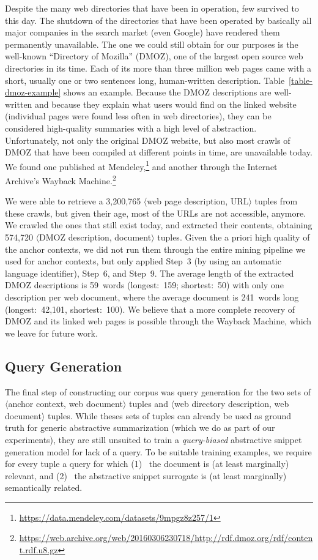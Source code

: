 \documentclass[sigconf]{acmart}
\newcommand{\Ni}{(1)~}
\newcommand{\Nii}{(2)~}
\begin{document}
Despite the many web directories that have been in operation, few survived to this day. The shutdown of the directories that have been operated by basically all major companies in the search market (even Google) have rendered them permanently unavailable. The one we could still obtain for our purposes is the well-known ``Directory of Mozilla'' (DMOZ), one of the largest open source web directories in its time. Each of its more than three million web pages came with a short, usually one or two sentences long, human-written description. Table~\ref{table-dmoz-example} shows an example. Because the DMOZ descriptions are well-written and because they explain what users would find on the linked website (individual pages were found less often in web directories), they can be considered high-quality summaries with a high level of abstraction. Unfortunately, not only the original DMOZ website, but also most crawls of DMOZ that have been compiled at different points in time, are unavailable today. We found one published at Mendeley,\footnote{\url{https://data.mendeley.com/datasets/9mpgz8z257/1}}
and another through the Internet Archive's Wayback Machine.\footnote{\fontsize{6.7pt}{7pt}\selectfont\url{https://web.archive.org/web/20160306230718/http://rdf.dmoz.org/rdf/content.rdf.u8.gz}}

We were able to retrieve a 3,200,765 $\langle$web page description, URL$\rangle$ tuples from these crawls, but given their age, most of the URLs are not accessible, anymore. We crawled the ones that still exist today, and extracted their contents, obtaining 574,720 $\langle$DMOZ description, document$\rangle$ tuples. Given the a priori high quality of the anchor contexts, we did not run them through the entire mining pipeline we used for anchor contexts, but only applied Step~3 (by using an automatic language identifier), Step~6, and Step~9. The average length of the extracted DMOZ descriptions is 59~words (longest:~159; shortest:~50) with only one description per web document, where the average document is 241~words long (longest:~42,101, shortest:~100). We believe that a more complete recovery of DMOZ and its linked web pages is possible through the Wayback Machine, which we leave for future work.

\subsection{Query Generation}

The final step of constructing our corpus was query generation for the two sets of $\langle$anchor context, web document$\rangle$ tuples and $\langle$web directory description, web document$\rangle$ tuples. While theses sets of tuples can already be used as ground truth for generic abstractive summarization (which we do as part of our experiments), they are still unsuited to train a {\em query-biased} abstractive snippet generation model for lack of a query. To be suitable training examples, we require for every tuple a query for which
\Ni
the document is (at least marginally) relevant, and
\Nii
the abstractive snippet surrogate is (at least marginally) semantically related.
\end{document}
